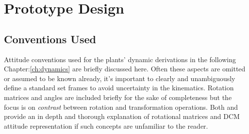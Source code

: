 \chapter{Prototype Design}
\label{ch:proto}
\section{Conventions Used}
\label{sec:proto.conventions}
Attitude conventions used for the plants' dynamic derivations in the following Chapter:\ref{ch:dynamics} are briefly discussed here. Often these aspects are omitted or assumed to be known already, it's important to clearly and unambiguously define a standard set frames to avoid uncertainty in the kinematics. Rotation matrices and angles are included briefly for the sake of completeness but the focus is on \emph{contrast} between rotation and transformation operations. Both \cite{spacecraftattitutdequaternions} and \cite{rigidbodylecture} provide an in depth and thorough explanation of rotational matrices and DCM attitude representation if such concepts are unfamiliar to the reader.
